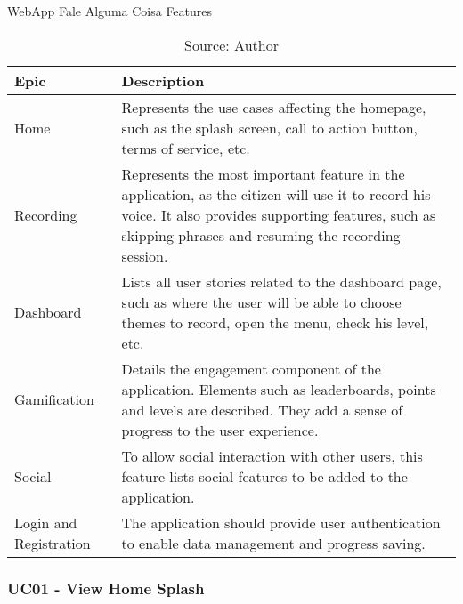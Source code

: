 \begin{table}[h]
    \centering
    \caption{WebApp Fale Alguma Coisa Features}
    \label{tab:falealgumacoisa-features}
    \begin{tabular}{|p{3cm}|p{10cm}|}
        \hline Epic & Description \\
        \hline Home & Represents the use cases affecting the homepage, such as the splash screen, call to action button, terms of service, etc. \\
        \hline Recording & Represents the most important feature in the application, as the citizen will use it to record his voice. It also provides supporting features, such as skipping phrases and resuming the recording session.\\ 
        \hline Dashboard & Lists all user stories related to the dashboard page, such as where the user will be able to choose themes to record, open the menu, check his level, etc. \\
        \hline Gamification & Details the engagement component of the application. Elements such as leaderboards, points and levels are described. They add a sense of progress to the user experience. \\
        \hline Social & To allow social interaction with other users, this feature lists social features to be added to the application. \\
        \hline Login and Registration & The application should provide user authentication to enable data management and progress saving. \\
        \hline
    \end{tabular}
    \caption*{Source: Author}
\end{table}

\subsubsection{UC01 - View Home Splash}

